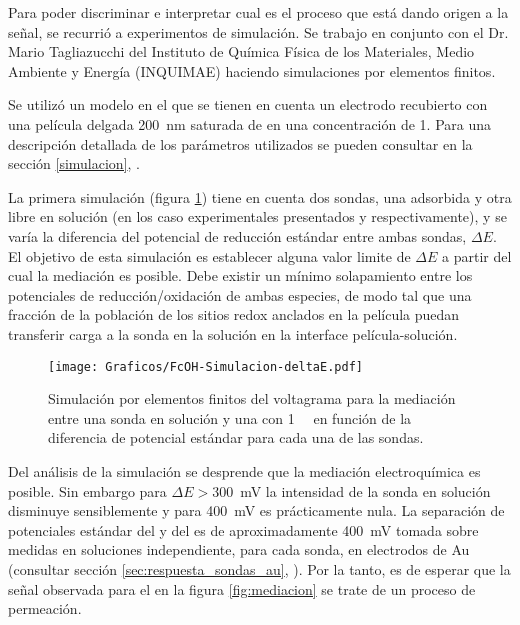 		Para poder discriminar e interpretar cual es el proceso que está dando origen a la señal, se recurrió a experimentos de simulación. Se trabajo en conjunto con el Dr. Mario Tagliazucchi del Instituto de Química Física de los Materiales, Medio Ambiente y Energía (INQUIMAE) haciendo simulaciones por elementos finitos.

		Se utilizó un modelo en el que se tienen en cuenta un electrodo recubierto con una película delgada \SI{200}{nm} saturada de  \aminorutenio en una concentración de \SI{1}{\Molar}. Para una descripción detallada de los parámetros utilizados se pueden consultar en la sección \ref{simulacion}, \pageref{simulacion}. 

		La primera simulación (figura \ref{fig:sim_mediacion}) tiene en cuenta dos sondas, una adsorbida y otra libre en solución (en los caso experimentales presentados \ru\space y \fc\space respectivamente), y se varía la diferencia del potencial de reducción estándar entre ambas sondas, $\Delta E$. El objetivo de esta simulación es establecer alguna valor limite de $\Delta E$ a partir del cual la mediación es posible. Debe existir un mínimo solapamiento entre los potenciales de reducción/oxidación de ambas especies, de modo tal que una fracción de la población de los sitios redox anclados en la película puedan transferir carga a la sonda en la solución en la interface película-solución.

			\begin{figure}[ht]
					\centering
			 	    \texttt{[image: Graficos/FcOH-Simulacion-deltaE.pdf]}
			        \caption[Simulación EQ de mediación redox]{Simulación por elementos finitos del voltagrama para la mediación entre una sonda en solución y una \pdmF\space con \ru\space \SI{1}{\milli\Molar} en función de la diferencia de potencial estándar para cada una de las sondas.}
			        \label{fig:sim_mediacion}
			      	\end{figure}

		Del análisis de la simulación se desprende que la mediación electroquímica es posible. Sin embargo para $\Delta E >$\SI{300}{\milli\volt} la intensidad de la sonda en solución disminuye sensiblemente y para \SI{400}{\milli\volt} es prácticamente nula. La separación de potenciales estándar del \aminorutenio\space y del \fc\space es de aproximadamente \SI{400}{\milli\volt} tomada sobre medidas en soluciones independiente, para cada sonda, en electrodos de Au (consultar sección \ref{sec:respuesta_sondas_au}, \pageref{sec:respuesta_sondas_au}). Por la tanto, es de esperar que la señal observada para el \fc\space en la figura \ref{fig:mediacion} se trate de un proceso de permeación.

